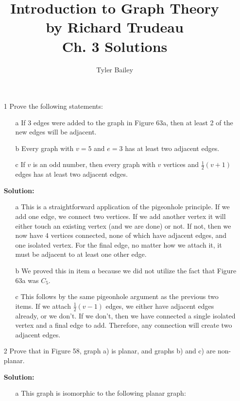 \documentclass{article}
\begin{document}
\title{%
  Introduction to Graph Theory \\
  \large by Richard Trudeau \\
   Ch. 3 Solutions}
   \author{Tyler Bailey}
\maketitle

\begin{enumerate}

	\item[1] Prove the following statements:
	
	\begin{enumerate}
		\item[a] If 3 edges were added to the graph in Figure 63a, then at least 2 of the new edges will be adjacent.
		\item[b] Every graph with $v = 5$ and $e = 3$ has at least two adjacent edges.
		\item[c] If $v$ is an odd number, then every graph with $v$ vertices and $\frac{1}{2}(v + 1)$ edges has at least two adjacent edges.
	\end{enumerate}
	
	\textbf{Solution:}
	\begin{enumerate}
		\item[a] This is a straightforward application of the pigeonhole principle. If we add one edge, we connect two vertices. If we add another vertex it will either touch an existing vertex (and we are done) or not. If not, then we now have 4 vertices connected, none of which have adjacent edges, and one isolated vertex. For the final edge, no matter how we attach it, it must be adjacent to at least one other edge.
		\item[b] We proved this in item $a$ because we did not utilize the fact that Figure 63a was $C_5$.
		\item[c] This follows by the same pigeonhole argument as the previous two items. If we attach $\frac{1}{2}(v - 1)$ edges, we either have adjacent edges already, or we don't. If we don't, then we have connected a single isolated vertex and a final edge to add. Therefore, any connection will create two adjacent edges.
	\end{enumerate}
	
	\item[2] Prove that in Figure 58, graph a) is planar, and graphs b) and c) are non-planar.
	
	\textbf{Solution:}
		\begin{enumerate}
			\item[a] This graph is isomorphic to the following planar graph:
			

\end{enumerate}
\end{enumerate}
\end{document}
